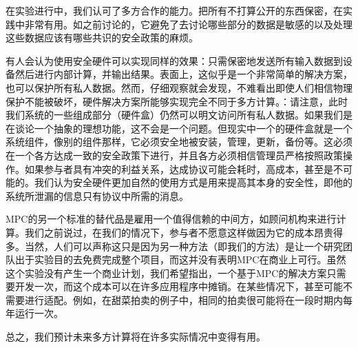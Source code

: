 在实验进行中，我们认可了多方合作的能力。把所有不打算公开的东西保密，在实践中非常有用。如之前讨论的，它避免了去讨论哪些部分的数据是敏感的以及处理这些数据应该有哪些共识的安全政策的麻烦。

有人会认为使用安全硬件可以实现同样的效果：只需保密地发送所有输入数据到设备然后进行内部计算，并输出结果。表面上，这似乎是一个非常简单的解决方案，也可以保护所有私人数据。然而，仔细观察就会发现，不难看出即使人们相信物理保护不能被破坏，硬件解决方案所能够实现完全不同于多方计算。：请注意，此时我们系统的一些组成部分（硬件盒）仍然可以明文访问所有私人数据。如果我们是在谈论一个抽象的理想功能，这不会是一个问题。但现实中一个的硬件盒就是一个系统组件，像别的组件那样，它必须安全地被安装，管理，更新，备份等。这必须在一个各方达成一致的安全政策下进行，并且各方必须相信管理员严格按照政策操作。如果参与者具有冲突的利益关系，达成协议可能会耗时，高成本，甚至是不可能的。我们认为安全硬件更加自然的使用方式是用来提高其本身的安全性，即他的系统所泄漏的信息只有协议中所需的消息。

MPC的另一个标准的替代品是雇用一个值得信赖的中间方，如顾问机构来进行计算。我们之前说过，在我们的情况下，参与者不愿意这样做因为它的成本昂贵得多。当然，人们可以声称这只是因为另一种方法（即我们的方法）是让一个研究团队出于实验目的去免费完成整个项目，而这并没有表明MPC在商业上可行。虽然这个实验没有产生一个商业计划，我们希望指出，一个基于MPC的解决方案只需要开发一次，而这个成本可以在许多应用程序中摊销。在某些情况下，甚至可能不需要进行适配。例如，在甜菜拍卖的例子中，相同的拍卖很可能将在一段时期内每年运行一次。

总之，我们预计未来多方计算将在许多实际情况中变得有用。